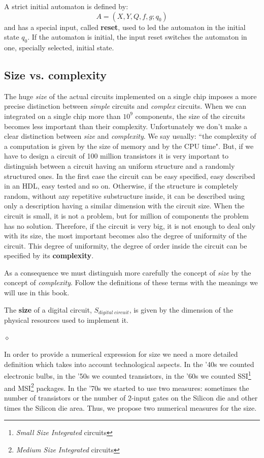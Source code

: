 A strict initial automaton is defined by:
$$A=(X, Y, Q, f, g; q_{0})$$
and has a special input, called {\bf reset}, used to led the
automaton in the initial state $q_{0}$. If the automaton is
initial, the input reset switches the automaton in one,
specially selected, initial state.


\subsection{Size vs. complexity}

The huge {\em size} of the actual circuits implemented on a single
chip imposes a more precise distinction between {\em simple}
circuits and {\em complex} circuits. When we can integrated on a
single chip more than $10^{9}$ components, the size of the circuits
becomes less important than their complexity. Unfortunately we
don't make a clear distinction between {\em size} and {\em
complexity}. We say usually: ``the complexity of a computation is
given by the size of memory and by the CPU time". But, if we have
to design a circuit of 100 million transistors it is very important
to distinguish between a circuit having an uniform structure and a
randomly structured ones. In the first case the circuit can be
easy specified, easy described in an HDL, easy tested and so on.
Otherwise, if the structure is completely random, without any
repetitive substructure inside, it can be described using only a
description having a similar dimension with the circuit size. When
the circuit is small, it is not a problem, but for million of
components the problem has no solution. Therefore, if the circuit
is very big, it is not enough to deal only with its size, the most
important becomes also the degree of uniformity of the circuit.
This degree of uniformity, the degree of order inside the circuit
can be specified by its {\bf complexity}.

As a consequence we must distinguish more carefully the concept of
{\em size} by the concept of {\em complexity}. Follow the
definitions of these terms with the meanings we will use in this
book.

\begin{definition}
The {\bf size} of a digital circuit, $S_{digital \; circuit}$, is
given by the dimension of the physical resources used to implement
it.

$\diamond$
\end{definition}

In order to provide a numerical expression for size we need a more
detailed definition which takes into account technological
aspects. In the '40s we counted electronic bulbs, in the '50s we
counted transistors, in the '60s we counted SSI\footnote{{\em
Small Size Integrated} circuits} and MSI\footnote{{\em Medium Size
Integrated} circuits} packages. In the '70s we started to use two
measures: sometimes the number of transistors or the number of
2-input gates on the Silicon die and other times the Silicon die
area. Thus, we propose two numerical measures for the size.

